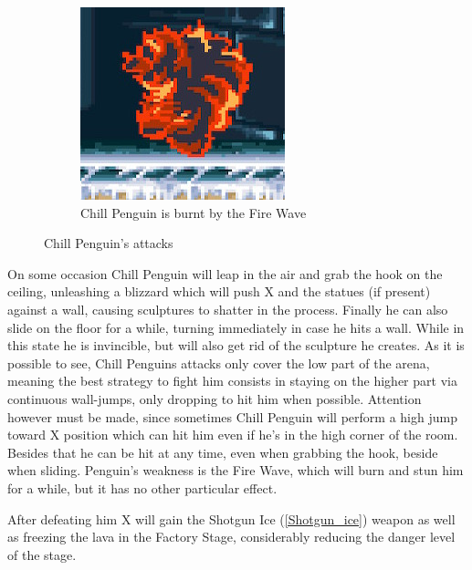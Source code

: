 \begin{figure}[htp]
\begin{subfigure}[t]{0.35\textwidth}
		\includegraphics[width=\linewidth]{figures/X1/Chill_penguin/Chill_burn.jpg}
		\caption{Chill Penguin is burnt by the Fire Wave}
	\end{subfigure}
	\caption{Chill Penguin's attacks}
\end{figure}
On some occasion Chill Penguin will leap in the air and grab the hook on the ceiling, unleashing a blizzard which will push X and the statues (if present) against a wall, causing sculptures to shatter in the process. Finally he can also slide on the floor for a while, turning immediately in case he hits a wall. While in this state he is invincible, but will also get rid of the sculpture he creates.  As it is possible to see, Chill Penguins attacks only cover the low part of the arena, meaning the best strategy to fight him consists in staying on the higher part via continuous wall-jumps, only dropping to hit him when possible. Attention however must be made, since sometimes Chill Penguin will perform a high jump toward X position which can hit him even if he's  in the high corner of the room. Besides that he can be hit at any time, even when grabbing the hook, beside when sliding. Penguin’s weakness is the Fire Wave, which will burn and stun him for a while, but it has no other particular effect.

After defeating him X will gain the Shotgun Ice (\ref{Shotgun_ice}) weapon as well as freezing the lava in the Factory Stage, considerably reducing the danger level of the stage.

